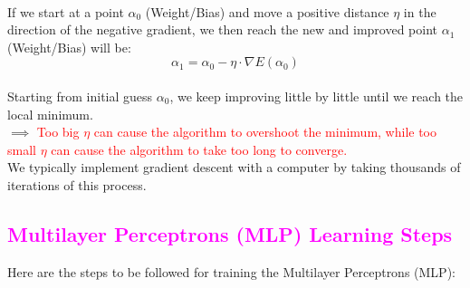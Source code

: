 \documentclass{book}
\begin{document}
\\
\vspace{2mm}
If we start at a point \(\alpha_0\) (Weight/Bias) and move a positive distance \(\eta\) in the direction of the negative gradient, we then reach the new and improved point \(\alpha_1\) (Weight/Bias) will be:
\[
    \alpha_1 = \alpha_0 - \eta \cdot \nabla E(\alpha_0)
\]
\\
\vspace{1mm}
Starting from initial guess \(\alpha_0\), we keep improving little by little until we reach the local minimum.\\
$\implies$ \textcolor{red}{Too big $\eta$ can cause the algorithm to overshoot the minimum, while too small $\eta$ can cause the algorithm to take too long to converge.}\\
We typically implement gradient descent with a computer by taking thousands of iterations of this process.
\newpage
\textcolor{magenta}{\section{\textbf{Multilayer Perceptrons (MLP) Learning Steps}}}
Here are the steps to be followed for training the Multilayer Perceptrons (MLP):
\end{document}
